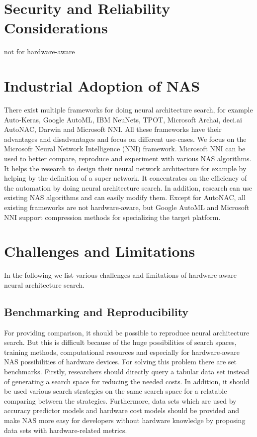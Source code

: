 \documentclass[conference]{IEEEtran}
\begin{document}
\section{Security and Reliability Considerations}
not for hardware-aware 

\section{Industrial Adoption of NAS}
There exist multiple frameworks for doing neural architecture search, for example Auto-Keras, Google AutoML, IBM NeuNets, TPOT, Microsoft Archai, deci.ai AutoNAC, Darwin and Microsoft NNI. All these frameworks have their advantages and disadvantages and focus on different use-cases. We focus on the Microsofr Neural Network Intelligence (NNI) framework. Microsoft NNI can be used to better compare, reproduce and experiment with various NAS algorithms. It helps the research to design their neural network architecture for example by helping by the definition of a super network. It concentrates on the efficiency of the automation by doing neural architecture search. In addition, research can use existing NAS algorithms and can easily modify them. Except for AutoNAC, all existing frameworks are not hardware-aware, but Google AutoML and Microsoft NNI support compression methods for specializing the target platform. 

\section{Challenges and Limitations}

In the following we list various challenges and limitations of hardware-aware neural architecture search. 

\subsection{Benchmarking and Reproducibility}
For providing comparison, it should be possible to reproduce neural architecture search. But this is difficult because of the huge possibilities of search spaces, training methods, computational resources and especially for hardware-aware NAS possibilities of hardware devices. For solving this problem there are set benchmarks. Firstly, researchers should directly query a tabular data set instead of generating a search space for reducing the needed costs. In addition, it should be used various search strategies on the same search space for a relatable comparing between the strategies. Furthermore, data sets which are used by accuracy predictor models and hardware cost models should be provided and make NAS more easy for developers without hardware knowledge by proposing data sets with hardware-related metrics.
\end{document}
